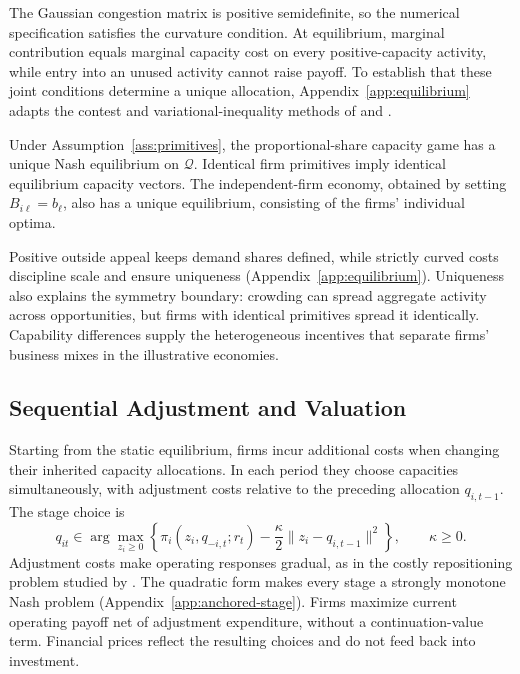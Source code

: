 The Gaussian congestion matrix is positive semidefinite, so the numerical
specification satisfies the curvature condition.
At equilibrium, marginal contribution equals marginal capacity cost on
every positive-capacity activity, while entry into an unused activity
cannot raise payoff.
To establish that these joint conditions determine a unique allocation,
Appendix~\ref{app:equilibrium} adapts the contest and variational-inequality
methods of
\citet{xu_zenou_zhou_conflict_2022} and
\citet{parise_ozdaglar_network_games_2019}.

\begin{proposition}\label{prop:equilibrium}
  Under Assumption~\ref{ass:primitives}, the proportional-share capacity game
  has a unique Nash equilibrium on $\mathcal Q$.
  Identical firm primitives imply identical equilibrium capacity vectors.
  The independent-firm economy, obtained by setting $B_{i\ell}=b_\ell$,
  also has a unique equilibrium, consisting of the firms' individual optima.
\end{proposition}

Positive outside appeal keeps demand shares defined, while strictly curved
costs discipline scale and ensure uniqueness
(Appendix~\ref{app:equilibrium}).
Uniqueness also explains the symmetry boundary: crowding can spread aggregate
activity across opportunities, but firms with identical primitives spread it
identically.
Capability differences supply the heterogeneous incentives that separate
firms' business mixes in the illustrative economies.

\subsection{Sequential Adjustment and Valuation}\label{sec:model-dynamics}

Starting from the static equilibrium, firms incur additional costs when
changing their inherited capacity allocations.
In each period they choose capacities simultaneously, with adjustment costs
relative to the preceding allocation $q_{i,t-1}$.
The stage choice is
\begin{equation}\label{eq:anchored-choice}
  q_{it}\in\arg\max_{z_i\geq0}\left\{
  \pi_i(z_i,q_{-i,t};r_t)-\frac{\kappa}{2}\|z_i-q_{i,t-1}\|^2\right\},\qquad\kappa\geq0.
\end{equation}
Adjustment costs make operating responses gradual, as in the costly
repositioning problem studied by \citet{sweeting_positioning_2013}.
The quadratic form makes every stage a strongly monotone Nash problem
(Appendix~\ref{app:anchored-stage}).
Firms maximize current operating payoff net of adjustment expenditure,
without a continuation-value term.
Financial prices reflect the resulting choices and do not feed back into
investment.

